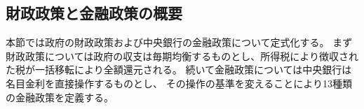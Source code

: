 
\subsection{財政政策と金融政策の概要}
\label{sec:chapter3_policies_overview}
本節では政府の財政政策および中央銀行の金融政策について定式化する。
まず財政政策については政府の収支は毎期均衡するものとし、所得税により徴収された税が一括移転により全額還元される。
続いて金融政策については中央銀行は名目金利を直接操作するものとし、
その操作の基準を変えることにより13種類の金融政策を定義する。
